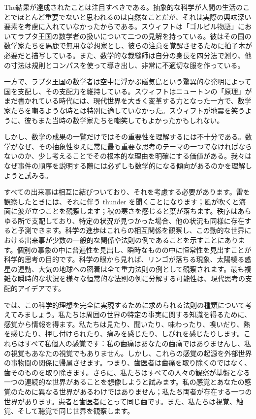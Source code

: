 \documentclass[a4paper,11pt,openany]{ltjsbook}
\begin{document}
The結果が達成されたことは注目すべきである。抽象的な科学が人間の生活のことでほとんど重要でないと思われるのは自然なことだが、それは実際の興味深い要素を考慮に入れていなかったからである。スウィフトは「ゴルビル物語」においてラプタ王国の数学者の扱いについて二つの見解を持っている。彼はその国の数学家たちを馬鹿で無用な夢想家とし、彼らの注意を覚醒させるために拍子木が必要だと描写している。また、数学的な裁縫師は自分の身長を四分法で測り、他の寸法は規則とコンパスを使って導き出し、非常に不適切な服を作っている。

一方で、ラプタ王国の数学者は空中に浮かぶ磁気島という驚異的な発明によって国を支配し、その支配力を維持している。スウィフトはニュートンの「原理」がまだ書かれている時代には、現代世界を大きく変革する力となった一方で、数学家たちを嘲るような時とは特別に適していなかった。スウィフトが地震を笑うように、彼もまた当時の数学家たちを嘲笑してもよかったかもしれない。

しかし、数学の成果の一覧だけではその重要性を理解するには不十分である。数学がなぜ、その抽象性ゆえに常に最も重要な思考のテーマの一つでなければならないのか、少し考えることでその根本的な理由を明確にする価値がある。我々はなぜ事件の順序を説明する際には必ずしも数学的になる傾向があるのかを理解しようと試みる。

すべての出来事は相互に結びついており、それを考慮する必要があります。雷を観察したときには、それに伴う thunder を聞くことになります；風が吹くと海面に波が立つことを観察します；秋の寒さを感じると葉が落ちます。秩序はあらゆる所で支配しており、特定の状況が見つかった場合、他の状況も同様に存在すると予測できます。科学の進歩はこれらの相互関係を観察し、この動的な世界における出来事が少数の一般的な関係や法則の例であることを示すことにあります。個別の事象の中に普遍性を見出し、瞬時なものの中に恒常性を見出すことが科学的思考の目的です。科学の眼から見れば、リンゴが落ちる現象、太陽繞る惑星の運動、大気の地球への密着は全て重力法則の例として観察されます。最も複雑な瞬時的な状況を様々な恒常的な法則の例に分解する可能性は、現代思考の支配的アイデアです。

では、この科学的理想を完全に実現するために求められる法則の種類について考えてみましょう。私たちは周囲の世界の特定の事実に関する知識を得るために、感覚から情報を得ます。私たちは見たり、聞いたり、味わったり、嗅いだり、熱を感じたり、押し付けられたり、痛みを感じたり、しびれを感じたりします。これらはすべて私個人の感覚です：私の歯痛はあなたの歯痛ではありませんし、私の視覚もあなたの視覚でもありません。しかし、これらの感覚の起源を外部世界の事物間の関係に帰属させます。つまり、歯医者は歯痛を取り除くのではなく、歯そのものを取り除きます。さらに、私たちはすべての人々の観察が基盤となる一つの連続的な世界があることを想像しようと試みます。私の感覚とあなたの感覚のために異なる世界があるわけではありません；私たち両者が存在する一つの世界があります。患者と歯医者にとって同じ歯です。また、私たちは視覚、触覚、そして聴覚で同じ世界を観察します。
\end{document}
